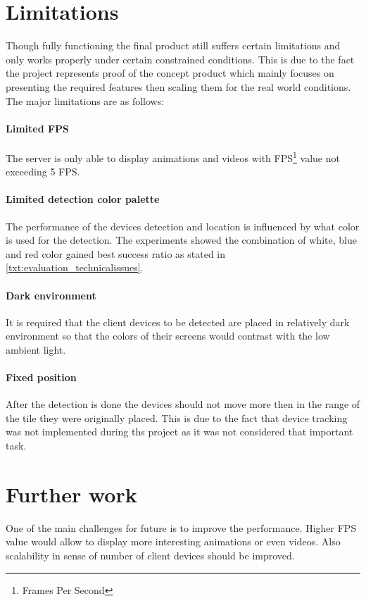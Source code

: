 \section{Limitations}
Though fully functioning the final product still suffers certain limitations and only works properly under certain constrained conditions. This is due to the fact the project represents proof of the concept product which mainly focuses on presenting the required features then scaling them for the real world conditions. The major limitations are as follows:

\paragraph{Limited FPS} The server is only able to display animations and videos with FPS\footnote{Frames Per Second} value not exceeding 5 FPS.

\paragraph{Limited detection color palette} The performance of the devices detection and location is influenced by what color is used for the detection. The experiments showed the combination of white, blue and red color gained best success ratio as stated in \ref{txt:evaluation_technicalissues}.

\paragraph{Dark environment} It is required that the client devices to be detected are placed in relatively dark environment so that the colors of their screens would contrast with the low ambient light.

\paragraph{Fixed position} After the detection is done the devices should not move more then in the range of the tile they were originally placed. This is due to the fact that device tracking was not implemented during ths project as it was not considered that important task.

\section{Further work}
One of the main challenges for future is to improve the performance.
Higher FPS value would allow to display more interesting animations or even videos.
Also scalability in sense of number of client devices should be improved.

